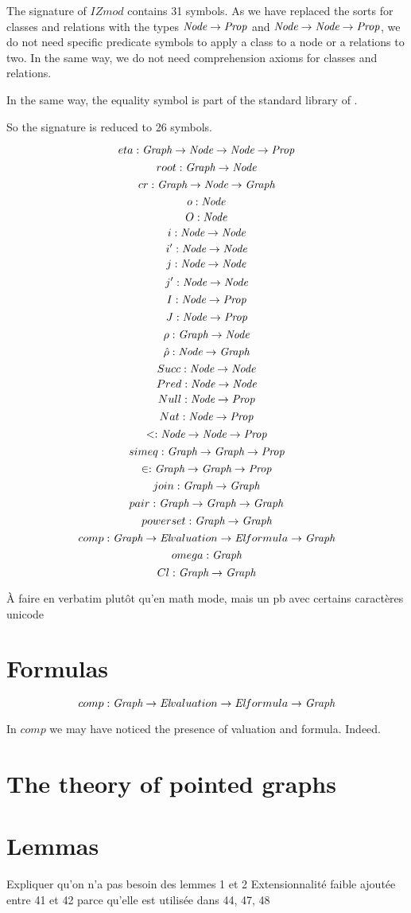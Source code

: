 \documentclass[a4paper]{article}
\begin{document}
The signature of $IZmod$ contains 31 symbols. As we have replaced the
sorts for classes and relations with the \dedukti types
$\Node \ra \Prop$ and $\Node \ra \Node \ra \Prop$, we do not need
specific predicate symbols to apply a class to a node or a relations
to two. In the same way, we do not need comprehension axioms for 
classes and relations. 

In the same way, the equality symbol is part of the standard library of 
\dedukti.

So the signature is reduced to 26 symbols. 


$$eta : \Graph \ra \Node \ra \Node \ra \Prop$$
$$root : \Graph \ra \Node$$
$$cr : \Graph \ra \Node \ra \Graph$$
$$o : \Node$$
$$O : \Node$$
$$i : \Node \ra \Node$$
$$i' : \Node \ra \Node$$
$$j : \Node \ra \Node$$
$$j' : \Node \ra \Node$$
$$I : \Node \ra \Prop$$
$$J : \Node \ra \Prop$$
$$\rho : \Graph \ra \Node$$
$$\hat{\rho} : \Node \ra \Graph$$
$$Succ : \Node \ra \Node$$
$$Pred : \Node \ra \Node$$
$$Null : \Node \ra \Prop$$
$$Nat : \Node \ra \Prop$$
$$< : \Node \ra \Node \ra \Prop$$
$$simeq : \Graph \ra \Graph \ra \Prop$$
$$\in : \Graph \ra \Graph \ra \Prop$$
$$join : \Graph \ra \Graph$$
$$pair : \Graph \ra \Graph \ra \Graph$$
$$powerset : \Graph \ra \Graph$$
$$comp : \Graph \ra \El valuation \ra \El formula \ra \Graph$$
$$omega : \Graph$$
$$Cl : \Graph \ra \Graph$$

À faire en verbatim plutôt qu'en math mode, mais un pb avec certains
caractères unicode

\section{Formulas}


$$comp : \Graph \ra \El valuation \ra \El formula \ra \Graph$$

In $comp$ we may have noticed the presence of valuation and formula. 
Indeed.

\section{The theory of pointed graphs}








\section{Lemmas}

Expliquer qu'on n'a pas besoin des lemmes 1 et 2
Extensionnalité faible ajoutée entre 41 et 42 parce qu'elle est utilisée dans 44, 47, 48 
\end{document}
